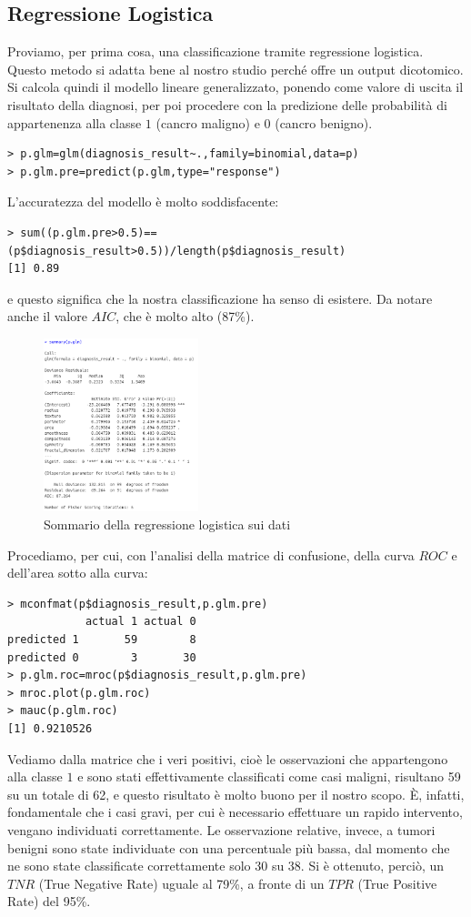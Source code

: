 \documentclass[11pt,a4paper,oneside]{article}
\begin{document}
\subsection{Regressione Logistica}
Proviamo, per prima cosa, una classificazione tramite regressione logistica. Questo metodo si adatta bene al nostro studio perché offre un output dicotomico. Si calcola quindi il modello lineare generalizzato, ponendo come valore di uscita il risultato della diagnosi, per poi procedere con la predizione delle probabilità di appartenenza alla classe $1$ (cancro maligno) e $0$ (cancro benigno).
\begin{verbatim}
> p.glm=glm(diagnosis_result~.,family=binomial,data=p)
> p.glm.pre=predict(p.glm,type="response")
\end{verbatim}
L'accuratezza del modello è molto soddisfacente:
\begin{verbatim}
> sum((p.glm.pre>0.5)==(p$diagnosis_result>0.5))/length(p$diagnosis_result)
[1] 0.89
\end{verbatim}
e questo significa che la nostra classificazione ha senso di esistere. Da notare anche il valore $AIC$, che è molto alto (87\%).
\begin{figure}[ht]
\centering
\includegraphics[width=0.4\textwidth]{images/glm}
\caption{Sommario della regressione logistica sui dati}
\label{fig:glm}
\end{figure}
Procediamo, per cui, con l'analisi della matrice di confusione, della curva $ROC$ e dell'area sotto alla curva:
\begin{verbatim}
> mconfmat(p$diagnosis_result,p.glm.pre)
            actual 1 actual 0
predicted 1       59        8
predicted 0        3       30
> p.glm.roc=mroc(p$diagnosis_result,p.glm.pre)
> mroc.plot(p.glm.roc)
> mauc(p.glm.roc)
[1] 0.9210526
\end{verbatim}
Vediamo dalla matrice che i veri positivi, cioè le osservazioni che appartengono alla classe $1$ e sono stati effettivamente classificati come casi maligni, risultano 59 su un totale di 62, e questo risultato è molto buono per il nostro scopo. È, infatti, fondamentale che i casi gravi, per cui è necessario effettuare un rapido intervento, vengano individuati correttamente. Le osservazione relative, invece, a tumori benigni sono state individuate con una percentuale più bassa, dal momento che ne sono state classificate correttamente solo 30 su 38. Si è ottenuto, perciò, un $TNR$ (True Negative Rate) uguale al 79\%, a fronte di un $TPR$ (True Positive Rate) del 95\%.
\end{document}
